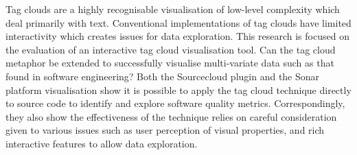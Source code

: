 Tag clouds are a highly recognisable visualisation of low-level complexity which deal primarily with text. Conventional implementations of tag clouds have limited interactivity which creates issues for data exploration. This research is focused on the evaluation of an interactive tag cloud visualisation tool. Can the tag cloud metaphor be extended to successfully visualise multi-variate data such as that found in software engineering? Both the Sourcecloud plugin and the Sonar platform visualisation show it is possible to apply the tag cloud technique directly to source code to identify and explore software quality metrics. Correspondingly, they also show the effectiveness of the technique relies on careful consideration given to various issues such as user perception of visual properties, and rich interactive features to allow data exploration.




